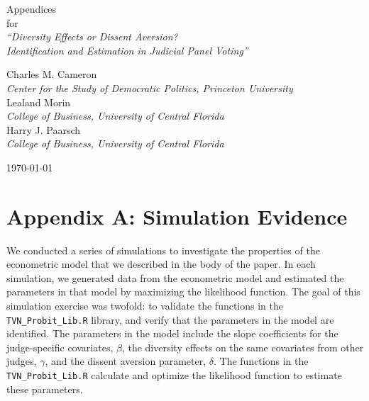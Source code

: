 \documentclass[11pt]{paper}
\begin{document}
\phantom{0}
\vspace{1.0in}


\begin{centering}

{\huge 
Appendices  \\
\bigskip
for \\
\bigskip
{\it ``Diversity Effects or Dissent Aversion? \\
Identification and Estimation in Judicial Panel Voting''} \\
}

\vspace{1.25in}


{\large 
Charles M. Cameron \\
{\it Center for the Study of Democratic Politics, Princeton University} \\
\medskip
Lealand Morin \\
{\it College of Business, University of Central Florida} \\
\medskip
Harry J. Paarsch \\
{\it College of Business, University of Central Florida} \\
}

\vspace{1.25in}



\today

\end{centering}


\pagebreak

\section*{Appendix A: Simulation Evidence}

We conducted a series of simulations
to investigate the properties of the econometric model 
that we described in the body of the paper. 
In each simulation, we generated data from the econometric model 
and estimated the parameters in that model
by maximizing the likelihood function. 
The goal of this simulation exercise was twofold:
to validate the functions in the \texttt{TVN\_Probit\_Lib.R} library, 
and verify that the parameters in the model are identified. 
The parameters in the model include the 
slope coefficients for the judge-specific covariates, $\beta$, 
the diversity effects on the same covariates from other judges, $\gamma$, 
and the dissent aversion parameter, $\delta$. 
The functions in the \texttt{TVN\_Probit\_Lib.R}
calculate and optimize the likelihood function
to estimate these parameters. 
\end{document}

